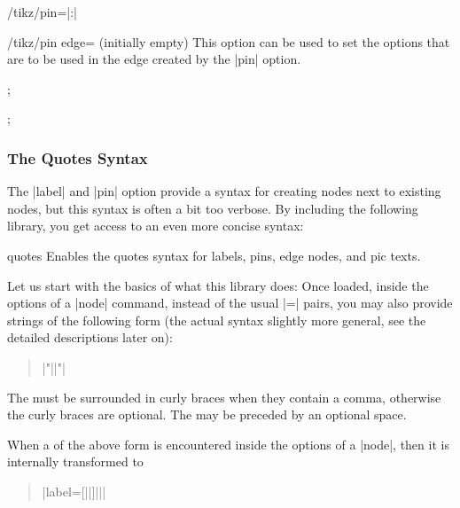 \begin{key}{/tikz/pin=|:|}
  \begin{key}{/tikz/pin edge= (initially \normalfont empty)}
    This option can be used to set the options that are to be used
    in the edge created by the |pin| option.
\begin{codeexample}[]
\tikz[pin distance=10mm]
  ;
\end{codeexample}
\begin{codeexample}[]
\tikz [every pin edge/.style={},
       initial/.style={pin={[pin distance=5mm,
                             pin edge={<-,shorten <=1pt}]left:start}}]
  ;
\end{codeexample}
  \end{key}
\end{key}


\subsubsection{The Quotes Syntax}
\label{section-label-quotes}

The |label| and |pin| option provide a syntax for
creating nodes next to existing nodes, but this syntax is often a
bit too verbose. By including the following library, you get access to
an even more concise syntax:

\begin{tikzlibrary}{quotes}
  Enables the quotes syntax for labels, pins, edge nodes, and pic
  texts. 
\end{tikzlibrary}

Let us start with the basics of what this library does: Once loaded,
inside the options of a |node| command, instead of the usual
|=| pairs, you may also provide strings of the
following form (the actual syntax slightly more general, see the
detailed descriptions later on):
\begin{quote}
  |"||"|
\end{quote}
The  must be surrounded in curly braces when they
contain a comma, otherwise the curly braces are optional. The may be
preceded by an optional space.

When a  of the above form is encountered inside the
options of a |node|, then it is internally transformed to
\begin{quote}
  |label={[||]||}|
\end{quote}

